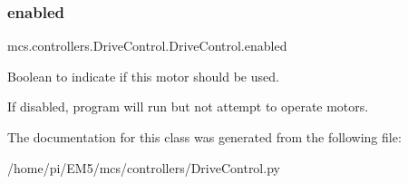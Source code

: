 \subsubsection{\texorpdfstring{enabled}{enabled}}
{\footnotesize\ttfamily mcs.\+controllers.\+Drive\+Control.\+Drive\+Control.\+enabled}



Boolean to indicate if this motor should be used. 

If disabled, program will run but not attempt to operate motors. 

The documentation for this class was generated from the following file\+:\begin{DoxyCompactItemize}
\item 
/home/pi/\+E\+M5/mcs/controllers/Drive\+Control.\+py\end{DoxyCompactItemize}
